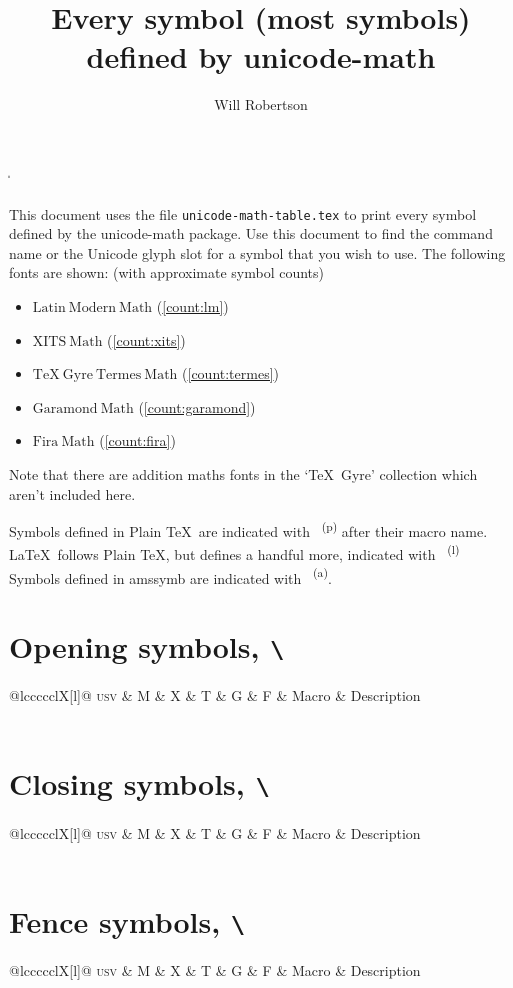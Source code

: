 \documentclass[final]{article}
\makeatletter
\def\cmd#1{\texttt{\textbackslash\expandafter\@gobble\string#1}}
\newcounter{#1}
\def\INPUT{}
\def\TABLE{%
  \par\noindent
  \begin{longtabu}[l]{@{}lccccclX[l]@{}}
    \toprule
    \textsc{usv} & M & X & T & G & F & Macro & Description \\
    \midrule \endhead
    \INPUT\\
    \bottomrule
  \end{longtabu}
}
\def\USV#1{\footnotesize\scshape\MakeLowercase{u+\@gobble#1}}
\def\CMD#1{\footnotesize\cmd#1}
\def\DESC#1{%
  \begin{spacing}{0.5}
    \RaggedRight\scriptsize #1%
  \end{spacing}
}
\newcommand\SHOW[1]{%
  \def\UnicodeMathSymbol##1##2##3##4{%
    \def\1{#1}\def\2{##3}%
    \ifx\1\2\PRINTLINE{##1}{##2}{##4}\fi
  }%
  \TABLE
}
\def\PRINTLINE#1#2#3{
    \def\tempa{
      \USV{#1} &
      \SYMB{#2}{lm}{#1} &
      \SYMB{#2}{xits}{#1} &
      \SYMB{#2}{termes}{#1} &
      \SYMB{#2}{garamond}{#1} &
      \SYMB{#2}{fira}{#1} &
      \CMD{#2}
      \tl_if_in:NnT \PLAIN {#2}
        {
          \makebox[0pt][l]
            { \color[gray]{0.7} \textsuperscript{\sffamily (p)} }
        }
      \tl_if_in:NnT \LTXSYM {#2}
        {
          \makebox[0pt][l]
            { \color[gray]{0.7} \textsuperscript{\sffamily (l)} }
        }
      \tl_if_in:NnT \AMSSYMB {#2}
        {
          \makebox[0pt][l]
            { \color[gray]{0.7} \textsuperscript{\sffamily (a)} }
        }
      &
      \DESC{#3} \\
    }%
    \expandafter\tempa
}
\def\SYMB#1#2#3{%
  \expandafter\iffontchar\csname#2\endcsname #3\relax
    \refstepcounter{#2}%
    \mathversion{#2}%
    $\displaystyle#1$%
  \fi
}
\def\PLAIN{\alpha\beta\gamma\delta\epsilon\zeta\eta\theta\iota\kappa\lambda\mu\nu\xi\pi\rho\sigma\tau\upsilon\phi\chi\psi\omega\varepsilon\vartheta\varpi\varrho\varsigma\varphi\Gamma\Delta\Theta\Lambda\Xi\Pi\Sigma\Upsilon\Phi\Psi\Omega
%
\aleph\hbar\imath\jmath\ell\wp\Re\Im\partial\infty\prime\emptyset\nabla\surd\top\bot\angle\triangle\forall\exists\neg\flat\natural\sharp\clubsuit\diamondsuit\heartsuit\spadesuit
%
\coprod\bigvee\bigwedge\biguplus\bigcap\bigcup\int\prod\sum\bigotimes\bigoplus\bigodot\oint\bigsqcup\smallint
%
\triangleleft\triangleright\bigtriangleup\bigtriangledown\wedge\land\vee\lor\cap\cup\ddagger\dagger\sqcap\sqcup\uplus\amalg\diamond\bullet\wr\div\odot\oslash\otimes\ominus\oplus\mp\pm\circ\bigcirc\setminus\cdot\ast\times\star\propto\sqsubseteq\sqsupseteq\parallel\mid\dashv\vdash\nearrow\searrow\nwarrow\swarrow\Leftrightarrow\Leftarrow\Rightarrow\neq\ne\lnot\leq\le\geq\ge\succ\prec\approx\succeq\preceq\supset\subset\supseteq\subseteq\in\ni\owns\gg\ll\not\leftrightarrow\leftarrow\gets\rightarrow\to\mapstochar\mapsto\sim\simeq\perp\equiv\asymp\smile\frown\leftharpoonup\leftharpoondown\rightharpoonup\rightharpoondown
%
\joinrel\relbar\Relbar\lhook\hookrightarrow\rhook\hookleftarrow\bowtie\models\Longrightarrow\longrightarrow\longleftarrow\Longleftarrow\longmapsto\longleftrightarrow\Longleftrightarrow\iff
%
\ldotp\cdotp\colon\ldots\cdots\vdots\ddots
%
\acute\grave\ddot\tilde\bar\breve\check\hat\vec\dot\widetilde\widehat
%
\overrightarrow\overleftarrow\overbrace\underbrace\lmoustache\rmoustache\lgroup\rgroup\arrowvert\Arrowvert\bracevert\Vert\vert\uparrow\downarrow\updownarrow\Uparrow\Downarrow\Updownarrow\backslash\rangle\langle\rbrace\lbrace\rceil\lceil\rfloor\lfloor\sqrt}
\def\LTXSYM{
\cong
\notin
\rightleftharpoons
\doteq
\mathring
}
\def\AMSSYMB{\boxdot\boxplus\boxtimes\square\blacksquare\centerdot\lozenge\blacklozenge\circlearrowright\circlearrowleft\leftrightharpoons\boxminus\Vdash\Vvdash\vDash\twoheadrightarrow\twoheadleftarrow\leftleftarrows\rightrightarrows\upuparrows\downdownarrows\upharpoonright\restriction\downharpoonright\upharpoonleft\downharpoonleft\rightarrowtail\leftarrowtail\leftrightarrows\rightleftarrows\Lsh\Rsh\rightsquigarrow\leftrightsquigarrow\looparrowleft\looparrowright\circeq\succsim\gtrsim\gtrapprox\multimap\therefore\because\doteqdot\Doteq\triangleq\precsim\lesssim\lessapprox\eqslantless\eqslantgtr\curlyeqprec\curlyeqsucc\preccurlyeq\leqq\leqslant\lessgtr\backprime\risingdotseq\fallingdotseq\succcurlyeq\geqq\geqslant\gtrless\vartriangleright\vartriangleleft\trianglerighteq\trianglelefteq\bigstar\between\blacktriangledown\blacktriangleright\blacktriangleleft\vartriangle\blacktriangle\triangledown\eqcirc\lesseqgtr\gtreqless\lesseqqgtr\gtreqqless\Rrightarrow\Lleftarrow\veebar\barwedge\doublebarwedge\measuredangle\sphericalangle\varpropto\smallsmile\smallfrown\Subset\Supset\Cup\doublecup\Cap\doublecap\curlywedge\curlyvee\leftthreetimes\rightthreetimes\subseteqq\supseteqq\bumpeq\Bumpeq\lll\llless\ggg\gggtr\circledS\pitchfork\dotplus\backsim\backsimeq\complement\intercal\circledcirc\circledast\circleddash\lvertneqq\gvertneqq\nleq\ngeq\nless\ngtr\nprec\nsucc\lneqq\gneqq\nleqslant\ngeqslant\lneq\gneq\npreceq\nsucceq\precnsim\succnsim\lnsim\gnsim\nleqq\ngeqq\precneqq\succneqq\precnapprox\succnapprox\lnapprox\gnapprox\nsim\ncong\diagup\diagdown\varsubsetneq\varsupsetneq\nsubseteqq\nsupseteqq\subsetneqq\supsetneqq\varsubsetneqq\varsupsetneqq\subsetneq\supsetneq\nsubseteq\nsupseteq\nparallel\nmid\nshortmid\nshortparallel\nvdash\nVdash\nvDash\nVDash\ntrianglerighteq\ntrianglelefteq\ntriangleleft\ntriangleright\nleftarrow\nrightarrow\nLeftarrow\nRightarrow\nLeftrightarrow\nleftrightarrow\divideontimes\varnothing\nexists\Finv\Game\eth\eqsim\beth\gimel\daleth\lessdot\gtrdot\ltimes\rtimes\shortmid\shortparallel\smallsetminus\thicksim\thickapprox\approxeq\succapprox\precapprox\curvearrowleft\curvearrowright\digamma\varkappa\Bbbk\hslash\backepsilon}
\makeatother
\begin{document}
\MakeShortVerb\|
\title{Every symbol (most symbols) defined by \textsf{unicode-math}}
\author{Will Robertson}
\maketitle

This document uses the file \texttt{unicode-math-table.tex}
to print every symbol defined by the \textsf{unicode-math}
package.
Use this document to find the command name or the Unicode glyph slot for a symbol that you wish to use.
The following fonts are shown: (with approximate symbol counts)
\begin{itemize}
\item[M]  $\mathup{Latin\ Modern\ Math}$ (\ref{count:lm})
\item[X]  $\mathup{XITS\ Math}$ (\ref{count:xits})
\item[T]  $\mathup{TeX\ Gyre\ Termes\ Math}$ (\ref{count:termes})
\item[G]  $\mathup{Garamond\ Math}$ (\ref{count:garamond})
\item[F]  $\mathup{Fira\ Math}$ (\ref{count:fira})
\end{itemize}
Note that there are addition maths fonts in the `\TeX\ Gyre' collection which aren't included here.

Symbols defined in Plain \TeX\ are indicated with~{\color[gray]{0.6} \textsuperscript{\sffamily (p)}} after their macro name.
\LaTeX\ follows Plain \TeX, but defines a handful more, indicated with~{\color[gray]{0.6} \textsuperscript{\sffamily (l)}}
Symbols defined in \textsf{amssymb} are indicated with~{\color[gray]{0.6} \textsuperscript{\sffamily (a)}}.

\tableofcontents

\clearpage
\section{Opening symbols, \cmd\mathopen}
\begingroup
\def\sqrt{\sqrtsign{}}
\def\longdivision{\longdivisionsign{}}
\SHOW\mathopen
\endgroup

\clearpage
\section{Closing symbols, \cmd\mathclose}
\SHOW\mathclose

\clearpage
\section{Fence symbols, \cmd\mathfence}
\SHOW\mathfence
\end{document}
